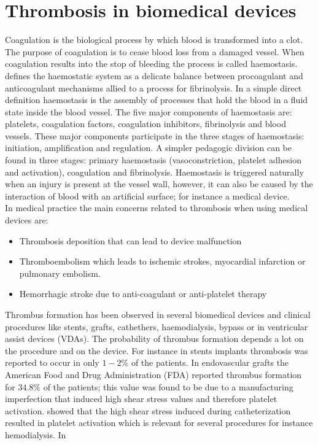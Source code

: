 \documentclass[%
 nofootinbib,
 amsmath,amssymb,
 aps,
 pra,
]{revtex4-1}
\begin{document}
\section{\label{sec:Blood}Thrombosis in biomedical devices}
Coagulation is the biological process by which blood is transformed into a clot. The purpose of coagulation is to cease blood loss from a damaged vessel. When coagulation results into the stop of bleeding the process is called haemostasis. \citet{Hoffbrand:2011} defines the haemostatic system as a delicate balance between procoagulant and anticoagulant mechanisms allied to a process for fibrinolysis. In a simple direct definition haemostasis is the assembly of processes that hold the blood in a fluid state inside the blood vessel. The five major components of haemostasis are: platelets, coagulation factors, coagulation inhibitors, fibrinolysis and blood vessels. These major components participate in the three stages of haemostasis: initiation, amplification and regulation. A simpler pedagogic division can be found in three stages: primary haemostasis (vasoconstriction, platelet adhesion and activation), coagulation and fibrinolysis. Haemostasis is triggered naturally when an injury is present at the vessel wall, however, it can also be caused by the interaction of blood with an artificial surface; for instance a medical device.\\ 
In medical practice the main concerns related to thrombosis when using medical devices are:
\begin{itemize}
\item Thrombosis deposition that can lead to device malfunction
\item Thromboembolism which leads to ischemic strokes, myocardial infarction or pulmonary embolism.
\item Hemorrhagic stroke due to anti-coagulant or anti-platelet therapy 
\end{itemize}
Thrombus formation has been observed in several biomedical devices and clinical procedures like stents, grafts, cathethers, haemodialysis, bypass or in %
ventricular assist devices (VDAs). The probability of thrombus formation depends a lot on the procedure and on the device. For instance in stents implants \citet{Wilson:2013} thrombosis was reported to occur in only $1-2 \%$ of the patients. In endovascular grafts the American %
Food and Drug Administration (FDA) reported thrombus formation for $34.8\%$ of the patients; this value was found to be due to a manufacturing imperfection that induced high shear stress values and therefore platelet activation. \citet{Chan:2009} showed that the high shear stress induced during catheterization resulted in platelet activation which is relevant for several procedures for instance hemodialysis. In %
\end{document}
